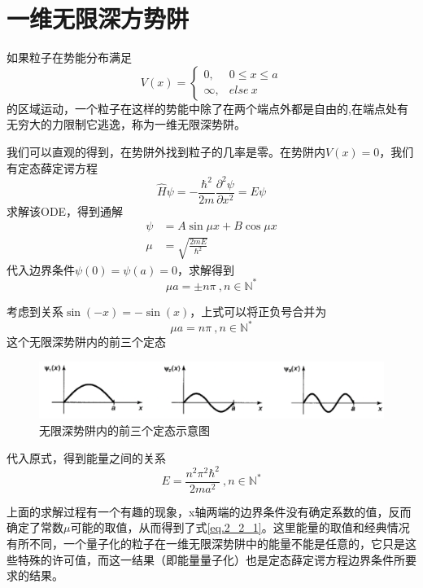 \section{一维无限深方势阱}
	如果粒子在势能分布满足
	\begin{equation}
	V(x)=\left\{\begin{array}{cl}
	0, & 0 \leq x \leq a \\
	\infty, & else \ x
	\end{array}\right.
	\end{equation}
	的区域运动，一个粒子在这样的势能中除了在两个端点外都是自由的,在端点处有无穷大的力限制它逃逸，称为一维无限深势阱。

	我们可以直观的得到，在势阱外找到粒子的几率是零。在势阱内$V(x)=0$，我们有定态薛定谔方程
	\begin{equation}
	\hat{H} \psi= -\frac{\hbar^2}{2m} \frac{\partial^2 \psi}{\partial x^2}= E \psi
	\end{equation}
	求解该ODE，得到通解
	\begin{align}
	\psi &= A \sin{\mu x}+B \cos{\mu x} \\
	\mu &= \sqrt{\frac{2mE}{\hbar^2}}
	\end{align}
	代入边界条件$\psi(0)=\psi(a)=0$，求解得到
	\begin{equation}
	\mu a = \pm n \pi \ , n \in \mathbb{N}^*
	\end{equation}

	考虑到关系$\sin(-x)=-\sin(x)$，上式可以将正负号合并为
	\begin{equation}
	\mu a = n \pi \ , n \in \mathbb{N}^*
	\end{equation}
	这个无限深势阱内的前三个定态
	\begin{figure}[H]
		\centering  %
		\includegraphics[width=0.7\linewidth]{sections/fig/1DInfiniteSquarePotential_1.png}
		\caption{无限深势阱内的前三个定态示意图} %
		\label{fig.1DInfiniteSquarePotential_1}
	\end{figure}

	代入原式，得到能量之间的关系
	\begin{equation}
	\label{eq.2_2_1}
	\boxed{E= \frac{n^2 \pi^2 \hbar^2}{2m a^2} \ , n \in \mathbb{N}^*}
	\end{equation}

	上面的求解过程有一个有趣的现象，x轴两端的边界条件没有确定系数的值，反而确定了常数$\mu$可能的取值，从而得到了式\ref{eq.2_2_1}。这里能量的取值和经典情况有所不同，一个量子化的粒子在一维无限深势阱中的能量不能是任意的，它只是这些特殊的许可值，而这一结果（即能量量子化）也是定态薛定谔方程边界条件所要求的结果。

